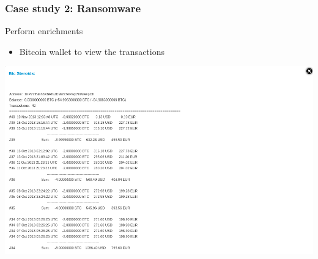 \begin{frame}
    \frametitle{Case study 2: Ransomware}
    Perform enrichments
    \begin{itemize}
        \item Bitcoin wallet to view the transactions
    \end{itemize}
    \includegraphics[width=1.0\linewidth]{pictures/case2/enrichment-btc.png}
\end{frame}

